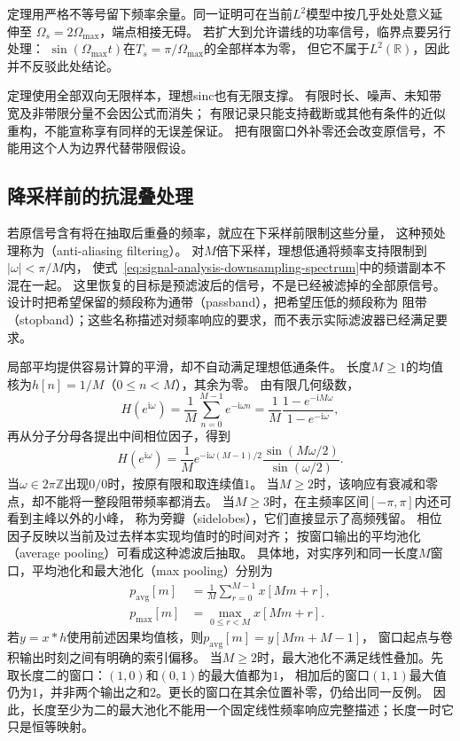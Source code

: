 定理用严格不等号留下频率余量。同一证明可在当前$L^2$模型中按几乎处处意义延伸至
$\Omega_s=2\Omega_{\max}$，端点相接无碍。
若扩大到允许谱线的功率信号，临界点要另行处理：
$\sin(\Omega_{\max}t)$在$T_s=\pi/\Omega_{\max}$的全部样本为零，
但它不属于$L^2(\mathbb R)$，因此并不反驳此处结论。

定理使用全部双向无限样本，理想sinc也有无限支撑。
有限时长、噪声、未知带宽及非带限分量不会因公式而消失；
有限记录只能支持截断或其他有条件的近似重构，不能宣称享有同样的无误差保证。
把有限窗口外补零还会改变原信号，不能用这个人为边界代替带限假设。

\subsection{降采样前的抗混叠处理}

若原信号含有将在抽取后重叠的频率，就应在下采样前限制这些分量，
这种预处理称为（anti-aliasing filtering）。
对$M$倍下采样，理想低通将频率支持限制到$|\omega|<\pi/M$内，
使式~\eqref{eq:signal-analysis-downsampling-spectrum}中的频谱副本不混在一起。
这里恢复的目标是预滤波后的信号，不是已经被滤掉的全部原信号。
设计时把希望保留的频段称为通带（passband），把希望压低的频段称为
阻带（stopband）；这些名称描述对频率响应的要求，而不表示实际滤波器已经满足要求。

局部平均提供容易计算的平滑，却不自动满足理想低通条件。
长度$M\geq1$的均值核为$h[n]=1/M$（$0\leq n<M$），其余为零。
由有限几何级数，
\[
  H(e^{\mathrm i\omega})=\frac1M\sum_{n=0}^{M-1}e^{-\mathrm i\omega n}
  =\frac1M\frac{1-e^{-\mathrm iM\omega}}{1-e^{-\mathrm i\omega}},
\]
再从分子分母各提出中间相位因子，得到
\begin{equation}
  H(e^{\mathrm i\omega})=
  \frac1M e^{-\mathrm i\omega(M-1)/2}
  \frac{\sin(M\omega/2)}{\sin(\omega/2)}.
  \label{eq:signal-analysis-moving-average-response}
\end{equation}
当$\omega\in2\pi\mathbb Z$出现$0/0$时，按原有限和取连续值$1$。
当$M\geq2$时，该响应有衰减和零点，却不能将一整段阻带频率都消去。
当$M\geq3$时，在主频率区间$[-\pi,\pi]$内还可看到主峰以外的小峰，
称为旁瓣（sidelobes），它们直接显示了高频残留。
相位因子反映以当前及过去样本实现均值时的时间对齐；
按窗口输出的平均池化（average pooling）可看成这种滤波后抽取。
具体地，对实序列和同一长度$M$窗口，平均池化和最大池化（max pooling）分别为
\[
 \begin{aligned}
  p_{\mathrm{avg}}[m]&=\frac1M\sum_{r=0}^{M-1}x[Mm+r],\\
  p_{\mathrm{max}}[m]&=\max_{0\leq r<M}x[Mm+r].
 \end{aligned}
\]
若$y=x*h$使用前述因果均值核，则$p_{\mathrm{avg}}[m]=y[Mm+M-1]$，
窗口起点与卷积输出时刻之间有明确的索引偏移。
当$M\geq2$时，最大池化不满足线性叠加。先取长度二的窗口：$(1,0)$和$(0,1)$的最大值都为$1$，
相加后的窗口$(1,1)$最大值仍为$1$，并非两个输出之和$2$。更长的窗口在其余位置补零，仍给出同一反例。
因此，长度至少为二的最大池化不能用一个固定线性频率响应完整描述；长度一时它只是恒等映射。

